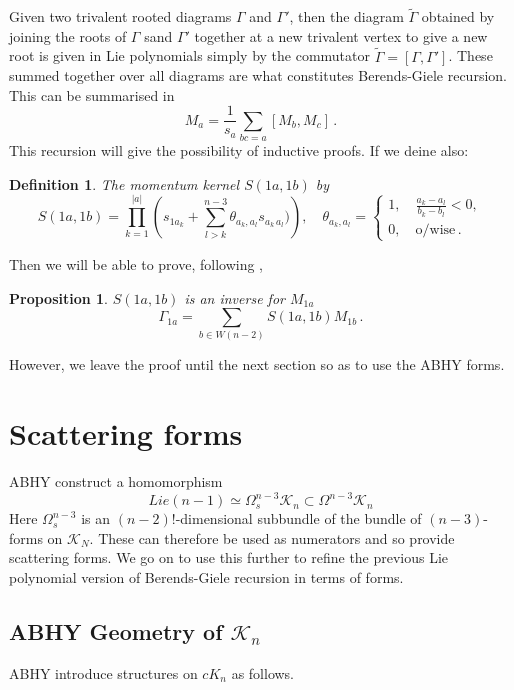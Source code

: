 \documentclass[11pt]{article}
\newcommand{\cK}{\mathcal{K}}
\newcommand{\1}{{\rm 1\hskip-0.25em I}}
\newtheorem{defn}{Definition}[section]
\newtheorem{propn}{Proposition}[section]
\begin{document}
Given two trivalent rooted diagrams $\Gamma$ and $\Gamma'$, then the diagram $\tilde \Gamma$ obtained by joining the roots of $\Gamma$ sand $\Gamma'$ together at a new trivalent vertex to give a new root is given in Lie polynomials simply by the commutator $\tilde \Gamma=[\Gamma,\Gamma']$.  These summed together over all diagrams are what constitutes Berends-Giele recursion.   This can be summarised in
\begin{equation}
M_a=\frac{1}{s_a}\sum_{bc=a} [M_b,M_c]\, .
\end{equation}
This recursion will give the possibility of inductive proofs.  If we deine also:
\begin{defn} The \emph{momentum kernel}  $S(1a,1b)$ by
$$
S(1a,1b)=\prod_{k=1}^{|a|}\left(s_{1 a_k}+\sum_{l>k}^{n-3} \theta_{a_k,a_l} s_{a_k\,a_l})\right) ,\quad \theta_{a_k,a_l}=\begin{cases} 1, \quad \frac{a_k-a_l}{b_k- b_l}<0,\\ 0, \quad \mbox{o/wise}\, .\end{cases}
$$
\end{defn}
Then we will be able to prove, following \cite{BjerrumBohr:2010hn},
\begin{propn}
$S(1a,1b)$ is an inverse for $M_{1a}$ $$
\Gamma_{1a}=\sum_{b\in W(n-2)}S(1a,1b)M_{1b}\, .
$$
\end{propn}
However, we leave the proof until the next section so as to use the ABHY forms.


\section{Scattering forms}
ABHY \cite{Arkani-Hamed:2017mur} construct a homomorphism  \begin{equation}
Lie(n-1)\simeq \Omega_s^{n-3}\cK_n\subset \Omega^{n-3}\cK_n \label{w-hom}
\end{equation}
Here $\Omega_s^{n-3}$ is an $(n-2)!$-dimensional subbundle of the bundle of $(n-3)$-forms on $\cK_N$.  These can therefore be used as numerators and so provide scattering forms.  We go on to use this further to refine the previous Lie polynomial version of Berends-Giele recursion in terms of forms.

\subsection{ABHY  Geometry of $\cK_n$}
 
ABHY introduce structures on $cK_n$ as follows.
\end{document}
